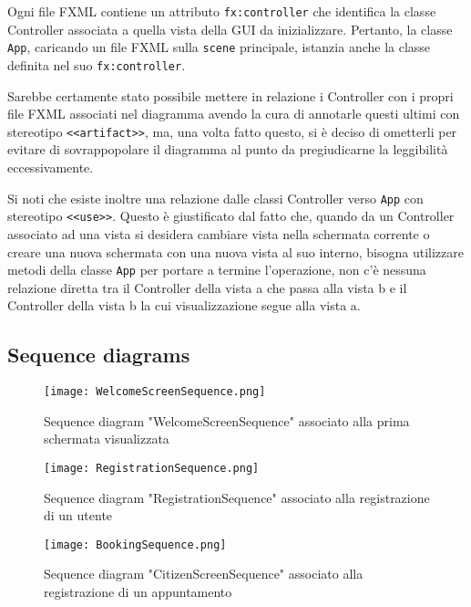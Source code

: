 \documentclass{article}
\begin{document}
Ogni file FXML contiene un attributo \texttt{fx:controller} che identifica la classe Controller associata a quella vista della GUI da inizializzare. Pertanto, la classe \texttt{App}, caricando un file FXML sulla \texttt{scene} principale, istanzia anche la classe definita nel suo \texttt{fx:controller}.

Sarebbe certamente stato possibile mettere in relazione i Controller con i propri file FXML associati nel diagramma avendo la cura di annotarle questi ultimi con stereotipo \texttt{<<artifact>>}, ma, una volta fatto questo, si è deciso di ometterli per evitare di sovrappopolare il diagramma al punto da pregiudicarne la leggibilità eccessivamente.

Si noti che esiste inoltre una relazione dalle classi Controller verso \texttt{App} con stereotipo \texttt{<<use>>}. Questo è giustificato dal fatto che, quando da un Controller associato ad una vista si desidera cambiare vista nella schermata corrente o creare una nuova schermata con una nuova vista al suo interno, bisogna utilizzare metodi della classe \texttt{App} per portare a termine l'operazione, non c'è nessuna relazione diretta tra il Controller della vista a che passa alla vista b e il Controller della vista b la cui visualizzazione segue alla vista a.

\subsection{Sequence diagrams}

\begin{center}
    \begin{figure}[H]
        \centering
        \caption{Sequence diagram "WelcomeScreenSequence" associato alla prima schermata visualizzata}
        \texttt{[image: WelcomeScreenSequence.png]}
    \end{figure}
\end{center}

\begin{center}
    \begin{figure}[H]
        \centering
        \caption{Sequence diagram "RegistrationSequence" associato alla registrazione di un utente}
        \texttt{[image: RegistrationSequence.png]}
    \end{figure}
\end{center}

\begin{center}
    \begin{figure}[H]
        \centering
        \caption{Sequence diagram "CitizenScreenSequence" associato alla registrazione di un appuntamento}
        \texttt{[image: BookingSequence.png]}
    \end{figure}
\end{center}
\end{document}
